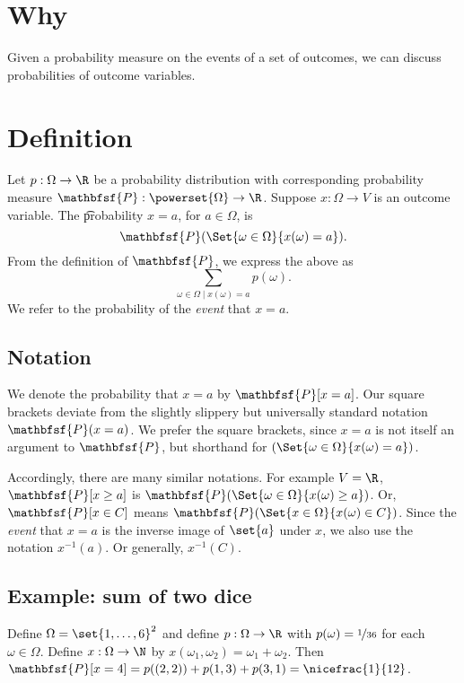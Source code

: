 
\section*{Why}

Given a probability measure on the events of a set of outcomes, we can discuss probabilities of outcome variables.

\section*{Definition}

Let $p: \Omega  \to \R $ be a probability distribution with corresponding probability measure $\mathbfsf{P} : \powerset{\Omega } \to \R $.
Suppose $x: \Omega  \to V$ is an outcome variable.
The \t{probability $x = a$}, for $a \in \Omega $, is
  \[
\textstyle
\mathbfsf{P} (\Set{\omega  \in \Omega }{x(\omega ) = a}).
  \]
From the definition of $\mathbfsf{P} $, we express the above as
  \[
\textstyle
\sum_{\omega  \in \Omega  \mid x(\omega ) = a} p(\omega ).
  \]
We refer to the probability of the \textit{event} that $x = a$.

\subsection*{Notation}

We denote the probability that $x = a$ by $\mathbfsf{P} [x =a]$.
Our square brackets deviate from the slightly slippery but universally standard notation $\mathbfsf{P} (x = a)$.
We prefer the square brackets, since $x=a$ is not itself an argument to $\mathbfsf{P} $, but shorthand for $(\Set{\omega  \in \Omega }{x(\omega ) = a})$.

Accordingly, there are many similar notations.
For example $V = \R $, $\mathbfsf{P} [x \geq a]$ is $\mathbfsf{P} (\Set{\omega  \in \Omega }{x(\omega ) \geq a})$.
Or, $\mathbfsf{P} [x \in C]$ means $\mathbfsf{P} (\Set{x \in \Omega }{x(\omega ) \in C})$.
Since the \textit{event} that $x = a$ is the inverse image of $\set{a}$ under $x$, we also use the notation $x^{-1}(a)$.
Or generally, $x^{-1}(C)$.

\subsection*{Example: sum of two dice}

Define $\Omega  = \set{1, \dots , 6}^2$ and define $p: \Omega \to \R $ with $p(\omega ) = \nicefrac{1}{36}$ for each $\omega \in \Omega $.
Define $x: \Omega  \to \N $ by $x(\omega _1, \omega _2) = \omega _1 + \omega _2$.
Then $\mathbfsf{P} [x = 4] = p((2, 2)) + p(1, 3) + p(3, 1) = \nicefrac{1}{12}$.

